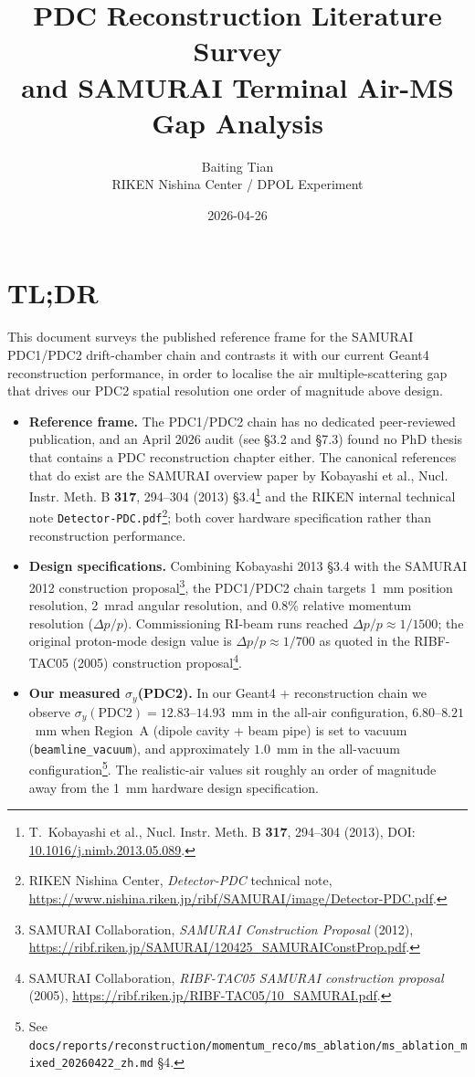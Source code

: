 \documentclass[a4paper, 11pt]{article}
\title{\textbf{PDC Reconstruction Literature Survey \\ and SAMURAI Terminal Air-MS Gap Analysis}}
\author{Baiting Tian \\ RIKEN Nishina Center / DPOL Experiment}
\date{2026-04-26}
\begin{document}
\maketitle
\tableofcontents
\clearpage

\section{TL;DR}
This document surveys the published reference frame for the SAMURAI PDC1/PDC2 drift-chamber chain and contrasts it with our current Geant4 reconstruction performance, in order to localise the air multiple-scattering gap that drives our PDC2 spatial resolution one order of magnitude above design.

\begin{itemize}
  \item \textbf{Reference frame.} The PDC1/PDC2 chain has no dedicated peer-reviewed publication, and an April 2026 audit (see §3.2 and §7.3) found no PhD thesis that contains a PDC reconstruction chapter either. The canonical references that do exist are the SAMURAI overview paper by Kobayashi et al., Nucl. Instr. Meth. B \textbf{317}, 294--304 (2013) §3.4\footnote{\label{fn:kobayashi2013}T.~Kobayashi et al., Nucl. Instr. Meth. B \textbf{317}, 294--304 (2013), DOI: \href{https://doi.org/10.1016/j.nimb.2013.05.089}{10.1016/j.nimb.2013.05.089}.} and the RIKEN internal technical note \texttt{Detector-PDC.pdf}\footnote{\label{fn:detectorpdc}RIKEN Nishina Center, \emph{Detector-PDC} technical note, \url{https://www.nishina.riken.jp/ribf/SAMURAI/image/Detector-PDC.pdf}.}; both cover hardware specification rather than reconstruction performance.
  \item \textbf{Design specifications.} Combining Kobayashi 2013 §3.4 with the SAMURAI 2012 construction proposal\footnote{\label{fn:samurai2012}SAMURAI Collaboration, \emph{SAMURAI Construction Proposal} (2012), \url{https://ribf.riken.jp/SAMURAI/120425_SAMURAIConstProp.pdf}.}, the PDC1/PDC2 chain targets 1~mm position resolution, 2~mrad angular resolution, and 0.8\% relative momentum resolution ($\Delta p/p$). Commissioning RI-beam runs reached $\Delta p/p \approx 1/1500$; the original proton-mode design value is $\Delta p/p \approx 1/700$ as quoted in the RIBF-TAC05 (2005) construction proposal\footnote{\label{fn:ribftac05}SAMURAI Collaboration, \emph{RIBF-TAC05 SAMURAI construction proposal} (2005), \url{https://ribf.riken.jp/RIBF-TAC05/10_SAMURAI.pdf}.}.
  \item \textbf{Our measured $\sigma_y$(PDC2).} In our Geant4 + reconstruction chain we observe $\sigma_y(\text{PDC2}) = 12.83$--$14.93$~mm in the all-air configuration, $6.80$--$8.21$~mm when Region~A (dipole cavity + beam pipe) is set to vacuum (\texttt{beamline\_vacuum}), and approximately $1.0$~mm in the all-vacuum configuration\footnote{\label{fn:msablation}See \texttt{docs/reports/reconstruction/momentum\_reco/ms\_ablation/ms\_ablation\_mixed\_20260422\_zh.md} §4.}. The realistic-air values sit roughly an order of magnitude away from the 1~mm hardware design specification.

\end{itemize}
\end{document}
